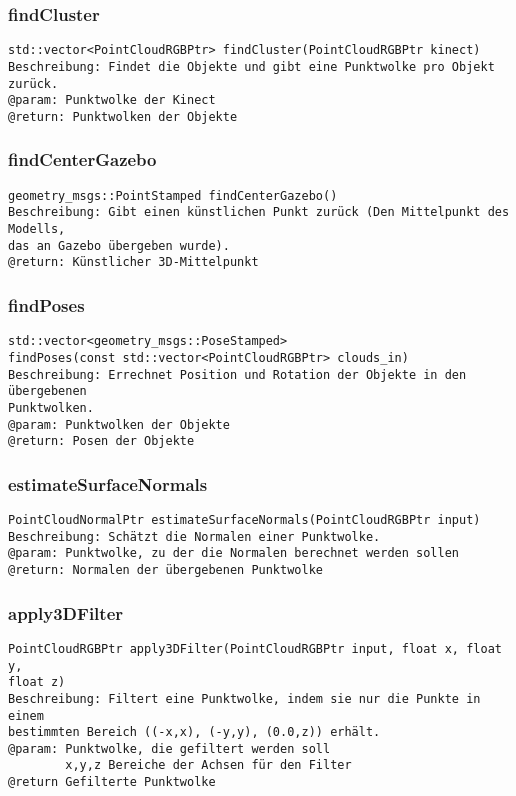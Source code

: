 \documentclass{suturo}
\begin{document}
\subsubsection{findCluster}
\begin{verbatim}
std::vector<PointCloudRGBPtr> findCluster(PointCloudRGBPtr kinect)
Beschreibung: Findet die Objekte und gibt eine Punktwolke pro Objekt zurück.
@param: Punktwolke der Kinect
@return: Punktwolken der Objekte
\end{verbatim}\label{func:findcluster}

\subsubsection{findCenterGazebo}
\begin{verbatim}
geometry_msgs::PointStamped findCenterGazebo()
Beschreibung: Gibt einen künstlichen Punkt zurück (Den Mittelpunkt des
Modells, 
das an Gazebo übergeben wurde).
@return: Künstlicher 3D-Mittelpunkt
\end{verbatim}\label{func:findcentergazebo}


\subsubsection{findPoses}
\begin{verbatim}
std::vector<geometry_msgs::PoseStamped> 
findPoses(const std::vector<PointCloudRGBPtr> clouds_in)
Beschreibung: Errechnet Position und Rotation der Objekte in den übergebenen
Punktwolken.
@param: Punktwolken der Objekte
@return: Posen der Objekte
\end{verbatim}\label{func:findposes}

\subsubsection{estimateSurfaceNormals}
\begin{verbatim}
PointCloudNormalPtr estimateSurfaceNormals(PointCloudRGBPtr input)
Beschreibung: Schätzt die Normalen einer Punktwolke.
@param: Punktwolke, zu der die Normalen berechnet werden sollen
@return: Normalen der übergebenen Punktwolke
\end{verbatim}\label{func:estimatesurfacenormals}

\subsubsection{apply3DFilter}
\begin{verbatim}
PointCloudRGBPtr apply3DFilter(PointCloudRGBPtr input, float x, float y, 
float z)
Beschreibung: Filtert eine Punktwolke, indem sie nur die Punkte in einem
bestimmten Bereich ((-x,x), (-y,y), (0.0,z)) erhält.
@param: Punktwolke, die gefiltert werden soll
		x,y,z Bereiche der Achsen für den Filter
@return Gefilterte Punktwolke
\end{verbatim}\label{func:apply3dfilter}
\end{document}

